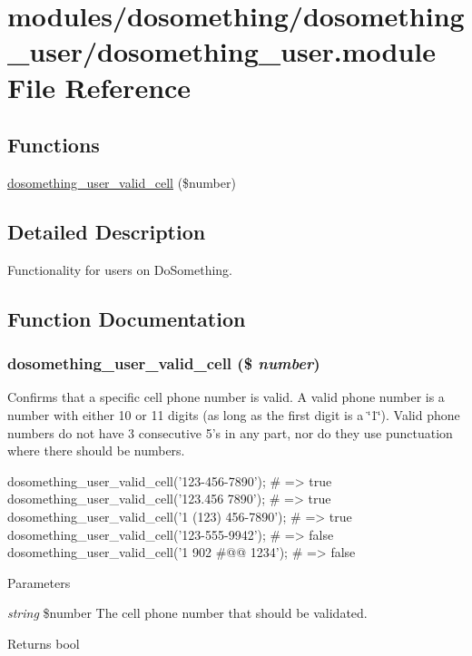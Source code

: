 \hypertarget{dosomething__user_8module}{
\section{modules/dosomething/dosomething\_\-user/dosomething\_\-user.module File Reference}
\label{dosomething__user_8module}
}
\subsection*{Functions}
\begin{DoxyCompactItemize}
\item 
\hyperlink{dosomething__user_8module_ae2ee3bafb69f17cb8cc4014d22f155c2}{dosomething\_\-user\_\-valid\_\-cell} (\$number)
\end{DoxyCompactItemize}


\subsection{Detailed Description}
Functionality for users on DoSomething. 

\subsection{Function Documentation}
\hypertarget{dosomething__user_8module_ae2ee3bafb69f17cb8cc4014d22f155c2}{
\subsubsection[{dosomething\_\-user\_\-valid\_\-cell}]{\setlength{\rightskip}{0pt plus 5cm}dosomething\_\-user\_\-valid\_\-cell (\$ {\em number})}}
\label{dosomething__user_8module_ae2ee3bafb69f17cb8cc4014d22f155c2}
Confirms that a specific cell phone number is valid. A valid phone number is a number with either 10 or 11 digits (as long as the first digit is a \char`\"{}1\char`\"{}). Valid phone numbers do not have 3 consecutive 5's in any part, nor do they use punctuation where there should be numbers.


\begin{DoxyCode}
  dosomething_user_valid_cell('123-456-7890');
  # => true
  dosomething_user_valid_cell('123.456 7890');
  # => true
  dosomething_user_valid_cell('1 (123) 456-7890');
  # => true
  dosomething_user_valid_cell('123-555-9942');
  # => false
  dosomething_user_valid_cell('1 902 #@@ 1234');
  # => false
\end{DoxyCode}



\begin{DoxyParams}{Parameters}
\item[{\em string}]\$number The cell phone number that should be validated. \end{DoxyParams}
\begin{DoxyReturn}{Returns}
bool 
\end{DoxyReturn}
